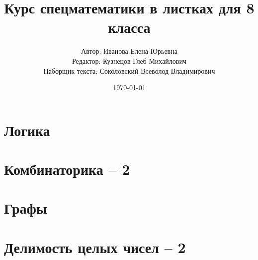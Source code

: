 \documentclass[11pt,a4paper]{report}
\title{Курс спецматематики в листках для 8 класса}
\author{Автор: Иванова Елена Юрьевна\\
	Редактор: Кузнецов Глеб Михайлович\\
	Наборщик текста: Соколовский Всеволод Владимирович}
\date{\today}
\theoremstyle{myrmk}
\theoremstyle{mypln}
\theoremstyle{mydfn}
\theoremstyle{myques}
\begin{document}
\maketitle
\tableofcontents
\newpage

\chapter{Логика}






\chapter{Комбинаторика -- 2}



\chapter{Графы}









\chapter{Делимость целых чисел -- 2}







\end{document}
